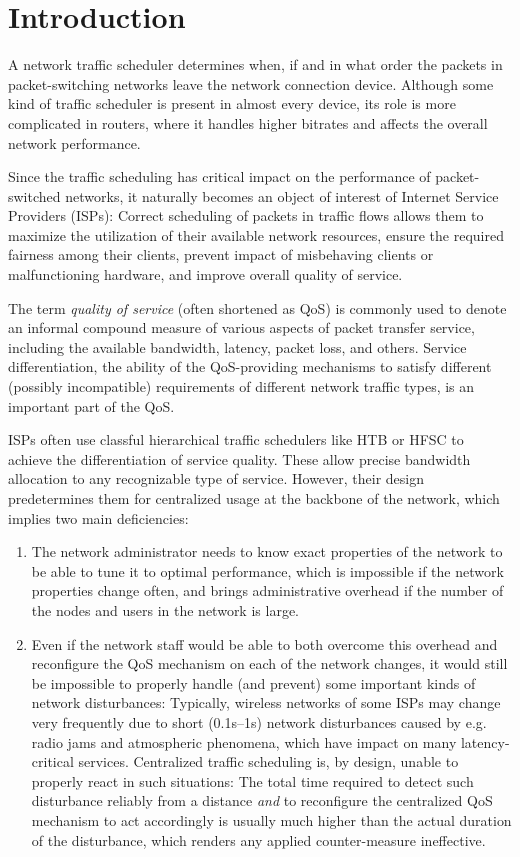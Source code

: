 \chapter*{Introduction}

A network traffic scheduler determines when, if and in what order the packets in packet-switching networks leave the network connection device. Although some kind of traffic scheduler is present in almost every device, its role is more complicated in routers, where it handles higher bitrates and affects the overall network performance.

Since the traffic scheduling has critical impact on the performance of packet-switched networks, it naturally becomes an object of interest of Internet Service Providers (ISPs): Correct scheduling of packets in traffic flows allows them to maximize the utilization of their available network resources, ensure the required fairness among their clients, prevent impact of misbehaving clients or malfunctioning hardware, and improve overall quality of service.

The term \emph{quality of service} (often shortened as QoS) is commonly used to denote an informal compound measure of various aspects of packet transfer service, including the available bandwidth, latency, packet loss, and others. Service differentiation, the ability of the QoS-providing mechanisms to satisfy different (possibly incompatible) requirements of different network traffic types, is an important part of the QoS.

ISPs often use classful hierarchical traffic schedulers like HTB or HFSC to achieve the differentiation of service quality. These allow precise bandwidth allocation to any recognizable type of service. However, their design predetermines them for centralized usage at the backbone of the network, which implies two main deficiencies:
\begin{enumerate}
\item The network administrator needs to know exact properties of the network to be able to tune it to optimal performance, which is impossible if the network properties change often, and brings administrative overhead if the number of the nodes and users in the network is large.
\item Even if the network staff would be able to both overcome this overhead and reconfigure the QoS mechanism on each of the network changes, it would still be impossible to properly handle (and prevent) some important kinds of network disturbances: Typically, wireless networks of some ISPs may change very frequently due to short (0.1s--1s) network disturbances caused by e.g. radio jams and atmospheric phenomena, which have impact on many latency-critical services. Centralized traffic scheduling is, by design, unable to properly react in such situations: The total time required to detect such disturbance reliably from a distance \emph{and} to reconfigure the centralized QoS mechanism to act accordingly is usually much higher than the actual duration of the disturbance, which renders any applied counter-measure ineffective.
\end{enumerate}

